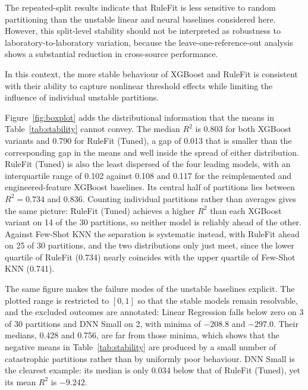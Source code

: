 \documentclass[pdflatex,sn-mathphys-num]{sn-jnl}%
\newif\ifrevmarks%
\newcommand{\revmark}[1]{\ifrevmarks\textcolor{revblue}{#1}\else#1\fi}%
\theoremstyle{thmstyleone}%
\theoremstyle{thmstyletwo}%
\theoremstyle{thmstylethree}%
\begin{document}
The repeated-split results indicate that RuleFit is less sensitive to random partitioning than the unstable linear and neural baselines considered here. However, this split-level stability should not be interpreted as robustness to laboratory-to-laboratory variation, because the leave-one-reference-out analysis shows a substantial reduction in cross-source performance.

In this context, the more stable behaviour of XGBoost and RuleFit is consistent with their ability to capture nonlinear threshold effects while limiting the influence of individual unstable partitions.

\revmark{Figure~\ref{fig:boxplot} adds the distributional information that the means in Table~\ref{tab:stability} cannot convey. The median $R^2$ is 0.803 for both XGBoost variants and 0.790 for RuleFit (Tuned), a gap of 0.013 that is smaller than the corresponding gap in the means and well inside the spread of either distribution. RuleFit (Tuned) is also the least dispersed of the four leading models, with an interquartile range of 0.102 against 0.108 and 0.117 for the reimplemented and engineered-feature XGBoost baselines. Its central half of partitions lies between $R^2=0.734$ and $0.836$. Counting individual partitions rather than averages gives the same picture: RuleFit (Tuned) achieves a higher $R^2$ than each XGBoost variant on 14 of the 30 partitions, so neither model is reliably ahead of the other. Against Few-Shot KNN the separation is systematic instead, with RuleFit ahead on 25 of 30 partitions, and the two distributions only just meet, since the lower quartile of RuleFit (0.734) nearly coincides with the upper quartile of Few-Shot KNN (0.741).}

\revmark{The same figure makes the failure modes of the unstable baselines explicit. The plotted range is restricted to $[0, 1]$ so that the stable models remain resolvable, and the excluded outcomes are annotated: Linear Regression falls below zero on 3 of 30 partitions and DNN Small on 2, with minima of $-208.8$ and $-297.0$. Their medians, 0.428 and 0.756, are far from those minima, which shows that the negative means in Table~\ref{tab:stability} are produced by a small number of catastrophic partitions rather than by uniformly poor behaviour. DNN Small is the clearest example: its median is only 0.034 below that of RuleFit (Tuned), yet its mean $R^2$ is $-9.242$.}
\end{document}
